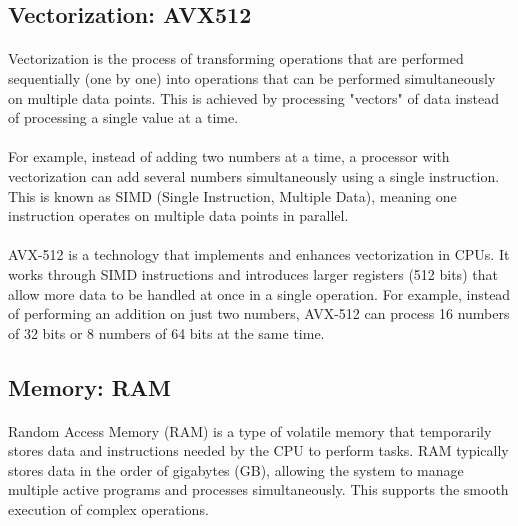 \subsection{Vectorization: AVX512}

    \paragraph*{}
    Vectorization is the process of transforming operations that are performed sequentially (one by one) into operations that can be 
    performed simultaneously on multiple data points. This is achieved by processing "vectors" of data instead of processing a single 
    value at a time.
    \par

    \paragraph*{}
    For example, instead of adding two numbers at a time, a processor with vectorization can add several numbers simultaneously using 
    a single instruction. This is known as SIMD (Single Instruction, Multiple Data), meaning one instruction operates on multiple data 
    points in parallel.
    \par

    \paragraph*{}
    AVX-512 is a technology that implements and enhances vectorization in CPUs. It works through SIMD instructions and introduces larger registers 
    (512 bits) that allow more data to be handled at once in a single operation. For example, instead of performing an addition 
    on just two numbers, AVX-512 can process 16 numbers of 32 bits or 8 numbers of 64 bits at the same time.
    \par

    

    \subsection{Memory: RAM}

    \paragraph*{}
    Random Access Memory (RAM) is a type of volatile memory that temporarily stores data and instructions needed 
    by the CPU to perform tasks. RAM typically stores data in the order of gigabytes (GB), allowing the system 
    to manage multiple active programs and processes simultaneously. This supports the smooth execution of complex 
    operations.
    \par

